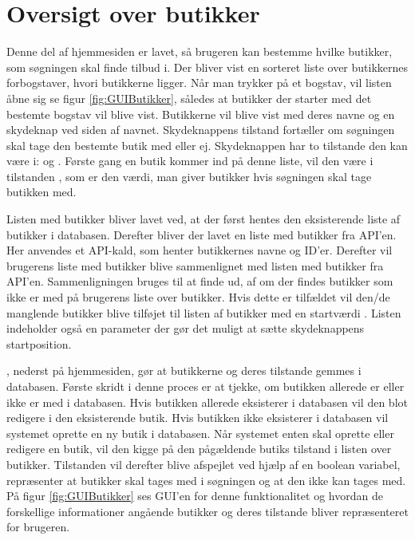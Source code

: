 \section{Oversigt over butikker} 
Denne del af hjemmesiden er lavet, så brugeren kan bestemme hvilke butikker, som søgningen skal finde tilbud i. Der bliver vist en sorteret liste over butikkernes forbogstaver, hvori butikkerne ligger.
Når man trykker på et bogstav, vil listen åbne sig se figur \ref{fig:GUIButikker}, således at butikker der starter med det bestemte bogstav vil blive vist. Butikkerne vil blive vist med deres navne og en skydeknap ved siden af navnet. Skydeknappens tilstand fortæller om søgningen skal tage den bestemte butik med eller ej. Skydeknappen har to tilstande den kan være i:  og . Første gang en butik kommer ind på denne liste, vil den være i tilstanden , som er den værdi, man giver butikker hvis søgningen skal tage butikken med.

Listen med butikker bliver lavet ved, at der først hentes den eksisterende liste af butikker i databasen. Derefter bliver der lavet en liste med butikker fra API'en. Her anvendes et API-kald, som henter butikkernes navne og ID'er. Derefter vil brugerens liste med butikker blive sammenlignet med listen med butikker fra API'en. Sammenligningen bruges til at finde ud, af om der findes butikker som ikke er med på brugerens liste over butikker. Hvis dette er tilfældet vil den/de manglende butikker blive tilføjet til listen af butikker med en startværdi . Listen indeholder også en parameter der gør det muligt at sætte skydeknappens startposition.

, nederst på hjemmesiden, gør at butikkerne og deres tilstande gemmes i databasen. Første skridt i denne proces er at tjekke, om butikken allerede er eller ikke er med i databasen. Hvis butikken allerede eksisterer i databasen vil den blot redigere i den eksisterende butik. Hvis butikken ikke eksisterer i databasen vil systemet oprette en ny butik i databasen.
Når systemet enten skal oprette eller redigere en butik, vil den kigge på den pågældende butiks tilstand i listen over butikker. Tilstanden vil derefter blive afspejlet ved hjælp af en boolean variabel,  repræsenter at butikker skal tages med i søgningen og  at den ikke kan tages med.
På figur \ref{fig:GUIButikker} ses GUI'en for denne funktionalitet og hvordan de forskellige informationer angående butikker og deres tilstande bliver repræsenteret for brugeren.